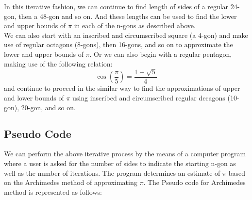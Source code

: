 \documentclass[12pt]{article}
\begin{document}
In this iterative fashion, we can continue to find length of sides of a regular 24-gon, then a 48-gon and so on. And these lengths can be used to find the lower and upper bounds of $\pi$ in each of the n-gons as described above.\\

We can also start with an inscribed and circumscribed square (a 4-gon) and make use of regular octagons (8-gons), then 16-gons, and so on to approximate the lower and upper bounds of $\pi$. Or we can also begin with a regular pentagon, making use of the following relation:
$$\cos(\frac{\pi}{5})=\frac{1+\sqrt{5}}{4}$$
and continue to proceed in the similar way to find the approximations of upper and lower bounds of $\pi$ using inscribed and circumscribed regular decagons (10-gon), 20-gon, and so on.\\

\subsection{Pseudo Code}  

We can perform the above iterative process by the means of a
computer program where a user is asked for the number of sides to indicate the
starting n-gon as well as the number of iterations. The program determines an
estimate of $\pi$ based on the Archimedes method of approximating $\pi$. The Pseudo
code for Archimedes method is represented as follows:
\end{document}
